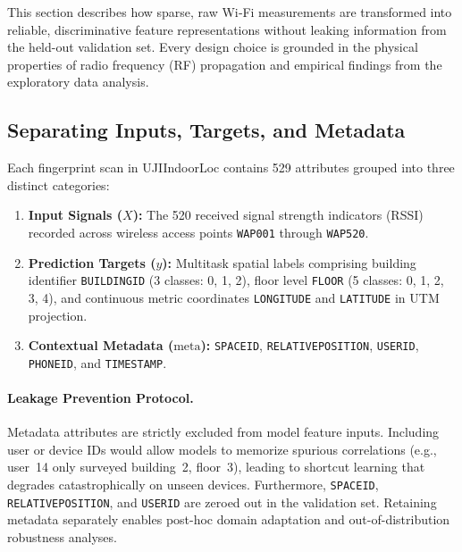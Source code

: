 
\label{sec:feature-engineering}

This section describes how sparse, raw Wi‑Fi measurements are transformed into reliable,
discriminative feature representations without leaking information from the held-out validation set.
Every design choice is grounded in the physical properties of radio frequency (RF) propagation
and empirical findings from the exploratory data analysis.

\subsection{Separating Inputs, Targets, and Metadata}

Each fingerprint scan in UJIIndoorLoc contains 529 attributes grouped into three distinct categories:
\begin{enumerate}
  \item \textbf{Input Signals ($X$):} The 520 received signal strength indicators (RSSI) recorded
        across wireless access points \texttt{WAP001} through \texttt{WAP520}.
  \item \textbf{Prediction Targets ($y$):} Multitask spatial labels comprising building identifier
        \texttt{BUILDINGID} (3 classes: 0, 1, 2), floor level \texttt{FLOOR} (5 classes: 0, 1, 2, 3, 4),
        and continuous metric coordinates \texttt{LONGITUDE} and \texttt{LATITUDE} in UTM projection.
  \item \textbf{Contextual Metadata ($\text{meta}$):} \texttt{SPACEID}, \texttt{RELATIVEPOSITION},
        \texttt{USERID}, \texttt{PHONEID}, and \texttt{TIMESTAMP}.
\end{enumerate}

\paragraph{Leakage Prevention Protocol.}
Metadata attributes are strictly excluded from model feature inputs. Including user or device IDs
would allow models to memorize spurious correlations (e.g., user~14 only surveyed building~2, floor~3),
leading to shortcut learning that degrades catastrophically on unseen devices. Furthermore,
\texttt{SPACEID}, \texttt{RELATIVEPOSITION}, and \texttt{USERID} are zeroed out in the validation set.
Retaining metadata separately enables post-hoc domain adaptation and out-of-distribution robustness analyses.

